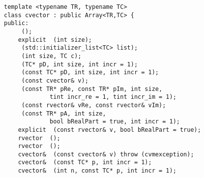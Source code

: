 \bigskip
\noindent
\verb"template <typename TR, typename TC>"\\
\verb"class cvector : public Array<TR,TC> {"\\
\verb"public:"\\
\verb"    "\verb" ();"\\
\verb"    explicit "\verb" (int size);"\\
\verb"    "\verb" (std::initializer_list<TC> list);"\\
\verb"    "\verb" (int size, TC c);"\\
\verb"    "\verb" (TC* pD, int size, int incr = 1);"\\
\verb"    "\verb" (const TC* pD, int size, int incr = 1);"\\
\verb"    "\verb" (const cvector& v);"\\
\verb"    "\verb" (const TR* pRe, const TR* pIm, int size,"\\
\verb"             tint incr_re = 1, tint incr_im = 1);"\\
\verb"    "\verb" (const rvector& vRe, const rvector& vIm);"\\
\verb"    "\verb" (const TR* pA, int size,"\\
\verb"             bool bRealPart = true, int incr = 1);"\\
\verb"    explicit "\verb" (const rvector& v, bool bRealPart = true);"\\
\verb"    rvector "\verb" ();"\\
\verb"    rvector "\verb" ();"\\
\verb"    cvector& "\verb" (const cvector& v) throw (cvmexception);"\\
\verb"    cvector& "\verb" (const TC* p, int incr = 1);"\\
\verb"    cvector& "\verb" (int n, const TC* p, int incr = 1);"\\
